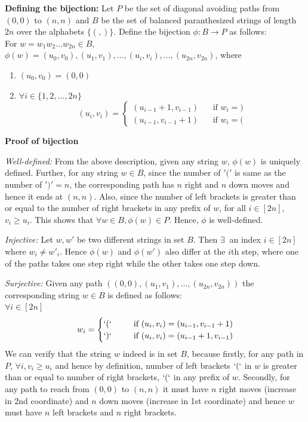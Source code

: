 \noindent\textbf{Defining the bijection:} Let $P$ be the set of diagonal avoiding paths from $(0,0)$ to $(n,n)$  and $B$ be the set of balanced paranthesized  strings of length $2n$ over the alphabets $\{(,)\}$. Define the bijection $\phi:B\rightarrow P$ as follows:\\
For $w=w_1 w_2 \ldots w_{2n}\in B$, $\phi(w) = (u_0,v_0), (u_1,v_1), \ldots, (u_i, v_i), \ldots, (u_{2n}, v_{2n})$, where 
\begin{enumerate}
    \item $(u_0,v_0)=(0,0)$ 
    \item $\forall i\in\{1,2,\ldots, 2n\}$\\
    \[
    (u_i, v_i) = 
    \begin{cases}  
    (u_{i-1}+1, v_{i-1})& ~~~~\text{if }w_i=)\\
    (u_{i-1}, v_{i-1}+1)&~~~~\text{if }w_i=(
    \end{cases}
    \]
\end{enumerate}
\textbf{Proof of bijection}
\begin{description}
\item \textit{Well-defined:} From the above description, given any string $w$, $\phi(w)$ is uniquely defined. Further, for any string $w\in B$, since the number of $'('$ is same as  the number of $')' = n$, the corresponding path has $n$ right and $n$ down moves and hence it ends at $(n,n)$. Also, since the number of left brackets is greater than or equal to the number of right brackets in any prefix of $w$, for all $i\in[2n]$, $v_i\ge u_i$. This shows that $\forall w\in B, \phi(w)\in P$. Hence,  $\phi$ is well-defined.
\item \textit{Injective:} Let $w, w'$ be two different strings in set $B$. Then $\exists~$ an index $i\in[2n]$ where $w_i\ne w'_i$. Hence $\phi(w)$ and $\phi(w')$ also differ at the $i$th step, where one of the paths takes one step right while the other takes one step down. 
\item \textit{Surjective:} 
Given any path $((0,0), (u_1, v_1), \ldots, (u_{2n}, v_{2n}))$ the corresponding string $w\in B$ is defined as follows:\\
$\forall i\in[2n]$
\[
w_i = 
\begin{cases}
`(`& ~~~~~\text{if } (u_i, v_i) = (u_{i-1}, v_{i-1}+1)\\
`)`& ~~~~~\text{if } (u_i,v_i) = (u_{i-1}+1, v_{i-1})
\end{cases}
\]
We can verify that the string $w$ indeed is in set $B$, because firstly, for any path in $P$, $\forall i, v_i\ge u_i$ and hence by definition, number of left brackets $`(`$ in $w$ is greater than or equal to number of right brackets, $`(`$ in any prefix of $w$. Secondly, for any path to reach from $(0,0)$ to $(n,n)$ it must have $n$ right moves (increase in 2nd coordinate) and $n$ down moves (increase in 1st coordinate) and hence $w$ must have $n$ left brackets and $n$ right brackets.
\end{description}



